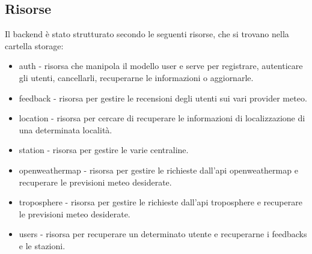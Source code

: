\subsection{Risorse}
Il backend è stato strutturato secondo le seguenti risorse, che si trovano nella cartella storage:
\begin{itemize}
\item auth - risorsa che manipola il modello user e serve per registrare, autenticare gli utenti, cancellarli, recuperarne le
informazioni o aggiornarle. 
\item feedback - risorsa per gestire le recensioni degli utenti sui vari provider meteo.
\item location - risorsa per cercare di recuperare le informazioni di localizzazione di una determinata località.
\item station - risorsa per gestire le varie centraline.
\item openweathermap - risorsa per gestire le richieste dall'api openweathermap e recuperare le previsioni meteo desiderate.
\item troposphere - risorsa per gestire le richieste dall'api troposphere e recuperare le previsioni meteo desiderate.
\item users - risorsa per recuperare un determinato utente e recuperarne i feedbacks e le stazioni.

\end{itemize}





